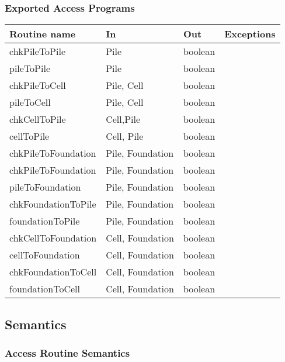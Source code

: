 \documentclass[12pt,fleqn]{article}
\begin{document}
\subsubsection* {Exported Access Programs}

\begin{tabular}{| l | l | l | l |}
\hline
\textbf{Routine name} & \textbf{In} & \textbf{Out} & \textbf{Exceptions}\\
\hline
chkPileToPile & Pile & boolean & ~\\
\hline
pileToPile & Pile & boolean & ~\\
\hline
chkPileToCell & Pile, Cell & boolean & ~\\
\hline
pileToCell & Pile, Cell & boolean & ~\\
\hline
chkCellToPile & Cell,Pile & boolean &  ~\\
\hline
cellToPile & Cell, Pile & boolean & \\
\hline
chkPileToFoundation & Pile, Foundation & boolean& \\
\hline

chkPileToFoundation & Pile, Foundation & boolean& \\
\hline

pileToFoundation & Pile, Foundation & boolean& \\
\hline

chkFoundationToPile & Pile, Foundation & boolean& \\
\hline

foundationToPile & Pile, Foundation & boolean& \\
\hline

chkCellToFoundation & Cell, Foundation & boolean& \\
\hline

cellToFoundation & Cell, Foundation & boolean& \\
\hline

chkFoundationToCell & Cell, Foundation & boolean& \\
\hline

foundationToCell & Cell, Foundation & boolean& \\
\hline

\end{tabular}

\subsection* {Semantics}

\subsubsection* {Access Routine Semantics}
\end{document}
